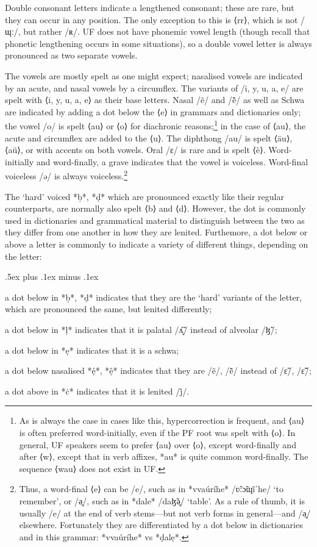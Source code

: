 \documentclass[a4paper, 12pt, oneside, final]{article}
\begin{document}
Double consonant letters indicate a lengthened consonant; these are rare, but they can occur in any position. The only
exception to this is ⟨rr⟩, which is not /ɰː/, but rather /ʀ/. UF does not have phonemic vowel length (though recall
that phonetic lengthening occurs in some situations), so a double vowel letter is always pronounced as two separate vowels.

The vowels are mostly spelt as one might expect; nasalised vowels are indicated by an acute, and nasal vowels by a circumflex.
The variants of /i, y, u, a, e/ are spelt with ⟨i, y, u, a, e⟩ as their base letters. Nasal /ẽ/ and /ẽ̃/ as well as Schwa are
indicated by adding a dot below the ⟨e⟩ in grammars and dictionaries only; the vowel /o/ is spelt ⟨au⟩ or ⟨o⟩ for diachronic reasons;\footnote{As is always the
case in cases like this, hypercorrection is frequent, and ⟨au⟩ is often preferred word-initially, even if the
PF root was spelt with ⟨o⟩. In general, UF speakers seem to prefer ⟨au⟩ over ⟨o⟩, except word-finally and after ⟨w⟩, except
that in verb affixes, *au* is quite common word-finally. The sequence ⟨wau⟩ does not exist in UF.} in the case of
⟨au⟩, the acute and circumflex are added to the ⟨u⟩. The diphthong /au/ is spelt ⟨äu⟩, ⟨aü⟩, or with accents on both vowels. Oral
/ɛ/ is rare and is spelt ⟨è⟩. Word-initially and word-finally, a grave indicates that the vowel is voiceless. Word-final
voiceless /ə/ is always voiceless.\footnote{Thus, a word-final ⟨e⟩
can be /e/, such as in *vvaúríhe* /ʋ̃ːɔ̃ɰĩˈhe/ ‘to remember’, or /ə̥/, such as in *dale* /daɮ̃ə̥/ ‘table’. As a rule of thumb, it is
usually /e/ at the end of verb stems—but not verb forms in general—and /ə̥/ elsewhere. Fortunately they are differentiated by a
dot below in dictionaries and in this grammar: *vvaúríhe* vs *ḍalẹ*.}

The ‘hard’ voiced *ḅ*, *ḍ* which are pronounced exactly like their regular counterparts, are normally also spelt ⟨b⟩ and
⟨d⟩. However, the dot is commonly used in dictionaries and grammatical material to distinguish between the two
as they differ from one another in how they are lenited. Furthemore, a dot below or above a letter is commonly to indicate
a variety of different things, depending on the letter:
\begin{items}\itemsep .5ex plus .1ex minus .1ex\relax
\item a dot below in *ḅ*, *ḍ* indicates that they are the ‘hard’ variants of the letter, which are pronounced
      the same, but lenited differently;
\item a dot below in *ḷ* indicates that it is palatal /ʎ̝̃/ instead of alveolar /ɮ̃/;
\item a dot below in *ẹ* indicates that it is a schwa;
\item a dot below nasalised *ẹ́*, *ệ* indicates that they are /ẽ/, /ẽ̃/ instead of /ɛ̃/, /ɛ̃̃/;
\item a dot above in *ċ* indicates that it is lenited /j̊/.
\end{items}
\end{document}
